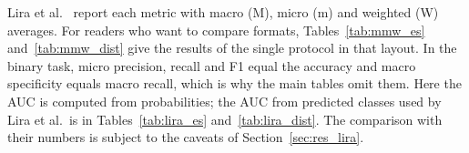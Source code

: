 \label{chap:apendice_mmw}

Lira et al.~\cite{Lira2025deep} report each metric with macro (M), micro (m) and weighted (W) averages. For readers who want to compare formats, Tables~\ref{tab:mmw_es} and~\ref{tab:mmw_dist} give the results of the single protocol in that layout. In the binary task, micro precision, recall and F1 equal the accuracy and macro specificity equals macro recall, which is why the main tables omit them. Here the AUC is computed from probabilities; the AUC from predicted classes used by Lira et al.\ is in Tables~\ref{tab:lira_es} and~\ref{tab:lira_dist}. The comparison with their numbers is subject to the caveats of Section~\ref{sec:res_lira}.




